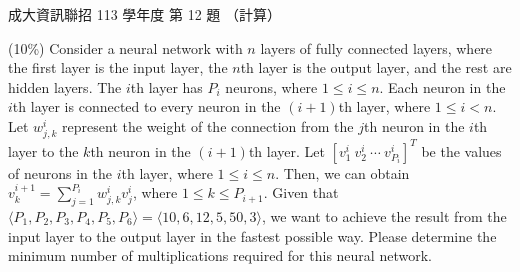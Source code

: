 \begin{pastexam}[label={px:ncku-113-prog-12}]{成大資訊聯招 113 學年度 第 12 題}
（計算）

(10\%) Consider a neural network with $n$ layers of fully connected layers, where the first layer
is the input layer, the $n$th layer is the output layer, and the rest are hidden layers. The $i$th
layer has $P_i$ neurons, where $1\le i\le n$. Each neuron in the $i$th layer is connected to every
neuron in the $(i+1)$th layer, where $1\le i<n$. Let $w^i_{j,k}$ represent the weight of the
connection from the $j$th neuron in the $i$th layer to the $k$th neuron in the $(i+1)$th layer.
Let $[v^i_1\ v^i_2\ \cdots\ v^i_{P_i}]^T$ be the values of neurons in the $i$th layer, where
$1\le i\le n$. Then, we can obtain $v^{i+1}_k=\sum_{j=1}^{P_i} w^i_{j,k}v^i_j$, where
$1\le k\le P_{i+1}$. Given that $\langle P_1,P_2,P_3,P_4,P_5,P_6\rangle=\langle
10,6,12,5,50,3\rangle$, we want to achieve the result from the input layer to the output layer in
the fastest possible way. Please determine the minimum number of multiplications required for this
neural network.
\end{pastexam}

